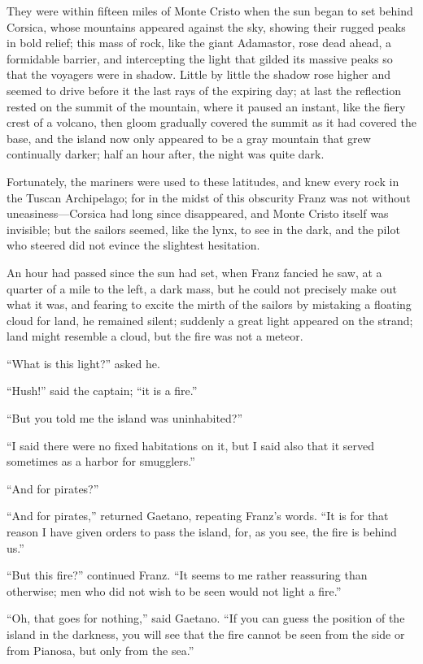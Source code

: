 They were within fifteen miles of Monte Cristo when the sun began to
set behind Corsica, whose mountains appeared against the sky, showing
their rugged peaks in bold relief; this mass of rock, like the giant
Adamastor, rose dead ahead, a formidable barrier, and intercepting the
light that gilded its massive peaks so that the voyagers were in
shadow. Little by little the shadow rose higher and seemed to drive
before it the last rays of the expiring day; at last the reflection
rested on the summit of the mountain, where it paused an instant, like
the fiery crest of a volcano, then gloom gradually covered the summit
as it had covered the base, and the island now only appeared to be a
gray mountain that grew continually darker; half an hour after, the
night was quite dark.

Fortunately, the mariners were used to these latitudes, and knew every
rock in the Tuscan Archipelago; for in the midst of this obscurity
Franz was not without uneasiness—Corsica had long since disappeared,
and Monte Cristo itself was invisible; but the sailors seemed, like the
lynx, to see in the dark, and the pilot who steered did not evince the
slightest hesitation.

An hour had passed since the sun had set, when Franz fancied he saw, at
a quarter of a mile to the left, a dark mass, but he could not
precisely make out what it was, and fearing to excite the mirth of the
sailors by mistaking a floating cloud for land, he remained silent;
suddenly a great light appeared on the strand; land might resemble a
cloud, but the fire was not a meteor.

“What is this light?” asked he.

“Hush!” said the captain; “it is a fire.”

“But you told me the island was uninhabited?”

“I said there were no fixed habitations on it, but I said also that it
served sometimes as a harbor for smugglers.”

“And for pirates?”

“And for pirates,” returned Gaetano, repeating Franz’s words. “It is
for that reason I have given orders to pass the island, for, as you
see, the fire is behind us.”

“But this fire?” continued Franz. “It seems to me rather reassuring
than otherwise; men who did not wish to be seen would not light a
fire.”

“Oh, that goes for nothing,” said Gaetano. “If you can guess the
position of the island in the darkness, you will see that the fire
cannot be seen from the side or from Pianosa, but only from the sea.”

